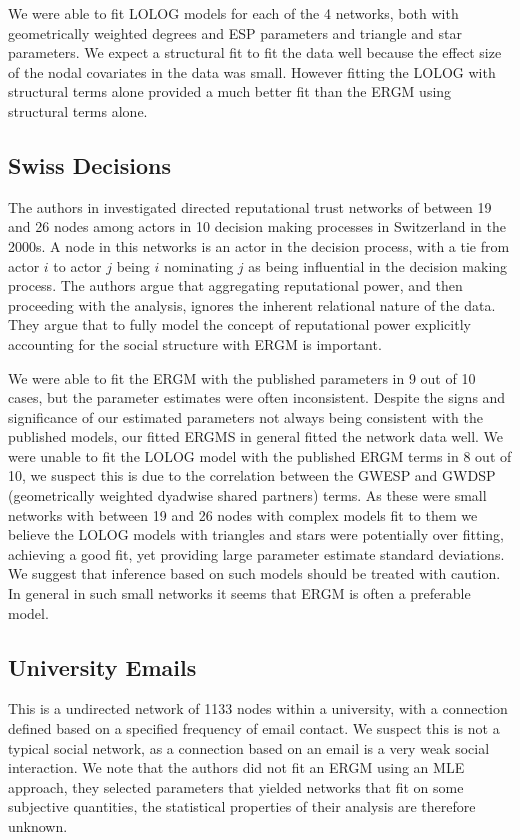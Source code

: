 \documentclass[
]{statsoc}
\begin{document}
We were able to fit LOLOG models for each of the 4 networks, both with
geometrically weighted degrees and ESP parameters and triangle and star
parameters. We expect a structural fit to fit the data well because the
effect size of the nodal covariates in the data was small. However
fitting the LOLOG with structural terms alone provided a much better fit
than the ERGM using structural terms alone.

\subsection{Swiss Decisions}

The authors in \cite{Fischer2015} investigated directed reputational
trust networks of between 19 and 26 nodes among actors in 10 decision
making processes in Switzerland in the 2000s. A node in this networks is
an actor in the decision process, with a tie from actor \(i\) to actor
\(j\) being \(i\) nominating \(j\) as being influential in the decision
making process. The authors argue that aggregating reputational power,
and then proceeding with the analysis, ignores the inherent relational
nature of the data. They argue that to fully model the concept of
reputational power explicitly accounting for the social structure with
ERGM is important.

We were able to fit the ERGM with the published parameters in 9 out of
10 cases, but the parameter estimates were often inconsistent. Despite
the signs and significance of our estimated parameters not always being
consistent with the published models, our fitted ERGMS in general fitted
the network data well. We were unable to fit the LOLOG model with the
published ERGM terms in 8 out of 10, we suspect this is due to the
correlation between the GWESP and GWDSP (geometrically weighted dyadwise
shared partners) terms. As these were small networks with between 19 and
26 nodes with complex models fit to them we believe the LOLOG models
with triangles and stars were potentially over fitting, achieving a good
fit, yet providing large parameter estimate standard deviations. We
suggest that inference based on such models should be treated with
caution. In general in such small networks it seems that ERGM is often a
preferable model.

\subsection{University Emails}

This is a undirected network of 1133 nodes within a university, with a
connection defined based on a specified frequency of email contact. We
suspect this is not a typical social network, as a connection based on
an email is a very weak social interaction. We note that the authors did
not fit an ERGM using an MLE approach, they selected parameters that
yielded networks that fit on some subjective quantities, the statistical
properties of their analysis are therefore unknown.
\end{document}
